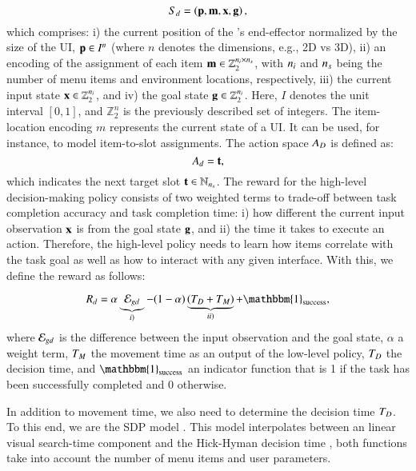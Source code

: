 \begin{equation}
    S_d = \left (\mathbf{p}, \mathbf{m}, \mathbf{x}, \mathbf{g} \right ),
    \label{eq:sd}
\end{equation}
which comprises: i) the current position of the \useragent's end-effector normalized by the size of the UI, $\mathbf{p} \in I^n$ (where $n$ denotes the dimensions, e.g., 2D vs 3D), ii) an encoding of the assignment of each item $\mathbf{m} \in \mathbb{Z}_2^{n_{i} \times n_{s}}$, with $n_{i}$ and $n_{s}$ being the number of menu items and environment locations, respectively, iii) the current input state $\mathbf{x} \in \mathbb{Z}_2^{n_{i}}$, and iv) the goal state $\mathbf{g} \in \mathbb{Z}_2^{n_{i}}$. Here, $I$ denotes the unit interval $[0,1]$, and 
$\mathbb{Z}_{2}^{n}$ is the previously described set of integers.
The item-location encoding $m$ represents the current state of a UI. It can be used, for instance, to model item-to-slot assignments. The action space $A_D$ is defined as:
\begin{equation}
    A_d = \mathbf{t},
    \label{eq:ad}
\end{equation}
which indicates the next target slot $\mathbf{t} \in \mathbb{N}_{n_{s}}$. The reward for the high-level decision-making policy consists of two weighted terms to trade-off between task completion accuracy and task completion time: i) how different the current input observation $\mathbf{x}$ is from the goal state $\mathbf{g}$, and ii) the time it takes to execute an action. Therefore, the high-level policy needs to learn how items correlate with the task goal as well as how to interact with any given interface. With this, we define the reward as follows: 

\begin{equation}
    \RewardPerPolicy_d =  \alpha \underbrace{\error_{gd}}_{i)} - (1-\alpha)\underbrace{\left(\dect + \mt\right)}_{ii)} + \mathbbm{1}_{\text{success}},
    \label{eq:rd}
\end{equation}
where $\mathcal{E}_{gd}$ is the difference between the input observation and the goal state, $\alpha$ a weight term, $T_M$  the movement time as an output of the low-level policy, $T_D$ the decision time, and $\mathbbm{1}_{\text{success}}$ an indicator function that is 1 if the task has been successfully completed and 0 otherwise. 

In addition to movement time, we also need to determine the decision time $T_D$. To this end, we are  the SDP model \cite{10.1145/1240624.1240723}. This model interpolates between an  linear visual search-time component  and the Hick-Hyman decision time \cite{hick1952rate} , both functions take into account the number of menu items and user parameters. 

